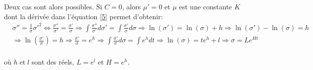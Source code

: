 \documentclass[11pt, letterpaper]{article}
\begin{document}
	Deux cas sont alors possibles. Si $C=0$, alors $\mu'=0$ et $\mu$ est une constante $K$ dont la dérivée dans l'équation \eqref{5} permet d'obtenir:
	\begin{align*}
	    &\sigma''=\frac{1}{\sigma}\sigma'^2 \iff\frac{\sigma''}{\sigma'}=\frac{\sigma'}{\sigma}\Longrightarrow\int\frac{\sigma''}{\sigma'}d\sigma'=\int\frac{\sigma'}{\sigma}d\sigma\Longrightarrow\ln(\sigma')=\ln(\sigma)+h\Longrightarrow\ln(\sigma')-\ln(\sigma)=h\\
	   &\Longrightarrow\ln(\frac{\sigma'}{\sigma})=h\Longrightarrow \frac{\sigma'}{\sigma}=e^h\Longrightarrow\int\frac{\sigma'}{\sigma}d\sigma=\int e^hdt\Longrightarrow\ln(\sigma)=te^h+l\Longrightarrow\sigma=Le^{Ht} 
	\end{align*}\\
	où $h\;\text{et}\;l$ sont des réels, $L=e^l$ et $H=e^h $.\\
	
\end{document}
